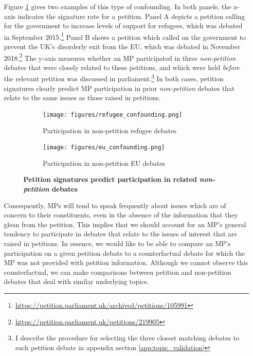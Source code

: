 \documentclass[12pt]{article}
\begin{document}
Figure \ref{fig:eu_refugee_confounding} gives two examples of this type of confounding. In both panels, the x-axis indicates the signature rate for a petition. Panel A depicts a petition calling for the government to increase levels of support for refugees, which was debated in September 2015.\footnote{\url{https://petition.parliament.uk/archived/petitions/105991}} Panel B shows a petition which called on the government to prevent the UK's disorderly exit from the EU, which was debated in November 2018.\footnote{\url{https://petition.parliament.uk/petitions/219905}} The y-axis measures whether an MP participated in three \emph{non-petition} debates that were closely related to these petitions, and which were held \emph{before} the relevant petition was discussed in parliament.\footnote{I describe the procedure for selecting the three closest matching debates to each petition debate in appendix section \ref{app:topic_validation}} In both cases, petition signatures clearly predict MP participation in prior \emph{non-petition} debates that relate to the same issues as those raised in petitions. 


\begin{figure}[t]
\centering

\begin{subfigure}[b]{.495\textwidth}
\caption{Participation in non-petition refugee debates}
\texttt{[image: figures/refugee\_confounding.png]}

\end{subfigure}
\begin{subfigure}[b]{.495\textwidth}
\caption{Participation in non-petition EU debates}
\texttt{[image: figures/eu\_confounding.png]}

\end{subfigure}
\caption{\label{fig:eu_refugee_confounding} \textbf{Petition signatures predict participation in related \emph{non-petition} debates}}

\end{figure}

Consequently, MPs will tend to speak frequently about issues which are of concern to their constituents, even in the absence of the information that they glean from the petition. This implies that we should account for an MP's general tendency to participate in debates that relate to the issues of interest that are raised in petitions. In essence, we would like to be able to compare an MP's participation on a given petition debate to a counterfactual debate for which the MP was not provided with petition information. Although we cannot observe this counterfactual, we can make comparisons between petition and non-petition debates that deal with similar underlying topics. 
\end{document}

